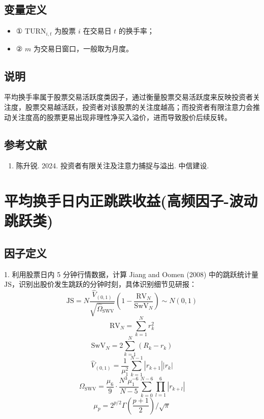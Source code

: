 \documentclass{article}
\begin{document}
\subsection{变量定义}
\begin{itemize}
    \item ① \( \mathrm{TURN}_{i,t} \) 为股票 \( i \) 在交易日 \( t \) 的换手率；
    \item ② \( m \) 为交易日窗口，一般取为月度。
\end{itemize}

\subsection{说明}
平均换手率属于股票交易活跃度类因子，通过衡量股票交易活跃度来反映投资者关注度，股票交易越活跃，投资者对该股票的关注度越高；而投资者有限注意力会推动关注度高的股票更易出现非理性净买入溢价，进而导致股价后续反转。

\subsection{参考文献}
\begin{enumerate}
    \item 陈升锐. 2024. 投资者有限关注及注意力捕捉与溢出. 中信建设.
\end{enumerate}

\section{平均换手日内正跳跌收益(高频因子-波动跳跃类)}

\subsection{因子定义}

1. 利用股票日内 5 分钟行情数据，计算 Jiang and Oomen (2008) 中的跳跃统计量 \( \mathrm{JS} \)，识别出股价发生跳跃的分钟时刻，具体识别细节见研报：
\begin{equation}
    \mathrm{JS} = N \frac{\hat{V}_{(0,1)}}{\sqrt{\hat{\Omega}_{\mathrm{SWV}}}} \left( 1 - \frac{\mathrm{RV}_N}{\mathrm{SwV}_N} \right) \sim N(0,1)
\end{equation}
\begin{equation}
    \mathrm{RV}_N = \sum_{k=1}^{N} r_k^2
\end{equation}
\begin{equation}
    \mathrm{SwV}_N = 2 \sum_{k=1}^{N} (R_k - r_k)
\end{equation}
\begin{equation}
    \hat{V}_{(0,1)} = \frac{1}{\mu_1^2} \sum_{k=1}^{N-1} |r_{k+1}| |r_k|
\end{equation}
\begin{equation}
    \Omega_{\mathrm{SWV}} = \frac{\mu_6}{9} \cdot \frac{N^3 \mu_1^{-6}}{N - 5} \sum_{k=0}^{N-6} \prod_{l=1}^{6} |r_{k+l}|
\end{equation}
\begin{equation}
    \mu_p = 2^{p/2} \Gamma \left( \frac{p+1}{2} \right) / \sqrt{\pi}
\end{equation}
\end{document}
